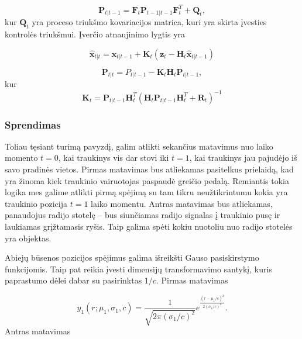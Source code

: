     \begin{equation}
        \label{eq:pdf_covariance}
        \mathbf{P}_{t|t-1} = \mathbf{F}_t\mathbf{P}_{t-1|t-1} \mathbf{F}_t^T + \mathbf{Q}_t,
    \end{equation}
    kur $\mathbf{Q}_t$ yra proceso triukšmo kovariacijos matrica, kuri yra skirta įvesties kontrolės triukšmui.
    Įverčio atnaujinimo lygtis yra

    \begin{equation}
        \mathbf{\hat{x}}_{t|t} = \mathbf{\hat{x}}_{t|t-1} + \mathbf{K}_t(\mathbf{z}_t - \mathbf{H}_t \mathbf{\hat{x}}_{t|t-1})
    \end{equation}

    \begin{equation}
        \mathbf{P}_{t|t} = P_{t|t-1} - \mathbf{K}_t \mathbf{H}_t \mathbf{P}_{t|t-1},
    \end{equation}
    kur
    \begin{equation}
        \mathbf{K}_t = \mathbf{P}_{t|t-1} \mathbf{H}_t^T(\mathbf{H}_t\mathbf{P}_{t|t-1}\mathbf{H}_t^T + \mathbf{R}_t)^{-1}
    \end{equation}
    

    \subsubsection{Sprendimas}

    Toliau tęsiant turimą pavyzdį, galim atlikti sekančius matavimus nuo laiko momento $t=0$, kai traukinys vis dar stovi iki $t=1$, kai traukinys jau pajudėjo iš savo pradinės vietos. Pirmas matavimas bus atliekamas pasitelkus prielaidą, kad yra žinoma kiek traukinio vairuotojas paspaudė greičio pedalą. Remiantis tokia logika mes galime atlikti pirmą spėjimą su tam tikru neužtikrintumu kokia yra traukinio pozicija $t=1$ laiko momentu. Antras matavimas bus atliekamas, panaudojus radijo stotelę -- bus siunčiamas radijo signalas į traukinio pusę ir laukiamas grįžtamasis ryšis. Taip galima spėti kokiu nuotoliu nuo radijo stotelės yra objektas. 

    Abiejų būsenos pozicijos spėjimus galima išreikšti Gauso pasiskirstymo funkcijomis. Taip pat reikia įvesti dimensijų transformavimo santykį, kuris paprastumo dėlei dabar su pasirinktas $1/c$. Pirmas matavimas

    \begin{equation}
        y_1(r; \mu_1, \sigma_1, c) = \frac{1}{\sqrt{2\pi (\sigma_1/c)^2}} e^{\frac{(r-\mu_1/c)^2}{2 (\sigma_1/c)^2}}.
    \end{equation}
    Antras matavimas

